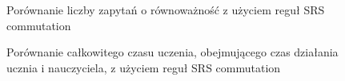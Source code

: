 

\begin{figure}[H]
\centering

\caption{Porównanie liczby zapytań o równoważność z użyciem reguł SRS commutation}
\label{fig:commutationEq}
\end{figure}

\begin{figure}[H]
\centering

\caption{Porównanie całkowitego czasu uczenia, obejmującego czas działania ucznia i nauczyciela, z użyciem reguł SRS commutation}
\label{fig:commutationTime}
\end{figure}
